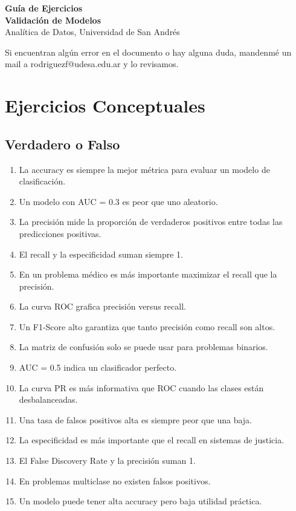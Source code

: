 \documentclass[12pt]{article}
\begin{document}
\begin{center}
  {\LARGE \textbf{Guía de Ejercicios\\Validación de Modelos}}\\[0.5em]
  {Analítica de Datos, Universidad de San Andrés}
\end{center}

Si encuentran algún error en el documento o hay alguna duda, mandenmé un mail a rodriguezf@udesa.edu.ar y lo revisamos.

\section{Ejercicios Conceptuales}

\subsection{Verdadero o Falso}

\begin{enumerate}
    \item La accuracy es siempre la mejor métrica para evaluar un modelo de clasificación.
    \item Un modelo con AUC = 0.3 es peor que uno aleatorio.
    \item La precisión mide la proporción de verdaderos positivos entre todas las predicciones positivas.
    \item El recall y la especificidad suman siempre 1.
    \item En un problema médico es más importante maximizar el recall que la precisión.
    \item La curva ROC grafica precisión versus recall.
    \item Un F1-Score alto garantiza que tanto precisión como recall son altos.
    \item La matriz de confusión solo se puede usar para problemas binarios.
    \item AUC = 0.5 indica un clasificador perfecto.
    \item La curva PR es más informativa que ROC cuando las clases están desbalanceadas.
    \item Una tasa de falsos positivos alta es siempre peor que una baja.
    \item La especificidad es más importante que el recall en sistemas de justicia.
    \item El False Discovery Rate y la precisión suman 1.
    \item En problemas multiclase no existen falsos positivos.
    \item Un modelo puede tener alta accuracy pero baja utilidad práctica.
\end{enumerate}
\end{document}
